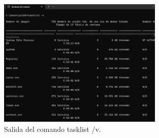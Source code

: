 \documentclass[a4paper,12pt]{article}
\begin{document}
\begin{enumerate}[label=\textbf{Pregunta \arabic*.}]
    \begin{figure}[h!]
        \centering
        \includegraphics[width=0.7\textwidth]{8.png}
        \caption{Salida del comando tasklist /v.}
    \end{figure}

    


\end{enumerate}
\end{document}
